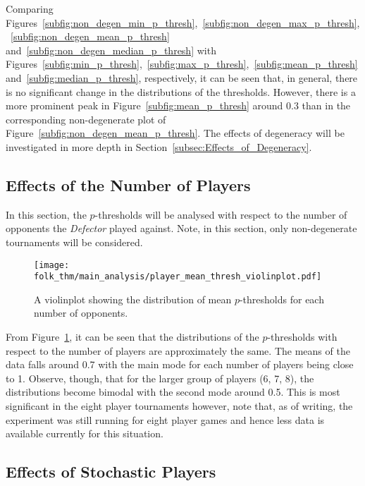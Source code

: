 Comparing Figures~\ref{subfig:non_degen_min_p_thresh},~\ref{subfig:non_degen_max_p_thresh},~\ref{subfig:non_degen_mean_p_thresh}
and~\ref{subfig:non_degen_median_p_thresh} with 
Figures~\ref{subfig:min_p_thresh},~\ref{subfig:max_p_thresh},~\ref{subfig:mean_p_thresh}
and~\ref{subfig:median_p_thresh}, respectively, it can be seen that, in general,
there is no significant change in the distributions of the thresholds. However,
there is a more prominent peak in Figure~\ref{subfig:mean_p_thresh} around 0.3
than in the corresponding non-degenerate plot of
Figure~\ref{subfig:non_degen_mean_p_thresh}. The effects of degeneracy will be
investigated in more depth in Section~\ref{subsec:Effects_of_Degeneracy}. 


\subsection{Effects of the Number of Players}\label{subsec:Effects_of_the_number_of_Players}
In this section, the \(p\)-thresholds will be analysed with respect to the
number of opponents the \textit{Defector} played against. Note, in this section,
only non-degenerate tournaments will be considered.


\begin{figure}
    \centering
    \texttt{[image: folk\_thm/main\_analysis/player\_mean\_thresh\_violinplot.pdf]}
    \caption{A violinplot showing the distribution of mean \(p\)-thresholds for each number of opponents.}\label{fig:player_mean_thresh_violinplot}
\end{figure}

From Figure~\ref{fig:player_mean_thresh_violinplot}, it can be seen that the
distributions of the \(p\)-thresholds with respect to the number of players are
approximately the same. The means of the data falls around 0.7 with the main
mode for each number of players being close to 1. Observe, though, that for the
larger group of players (6, 7, 8), the distributions become bimodal with the
second mode around 0.5. This is most significant in the eight player tournaments
however, note that, as of writing, the experiment was still running for eight
player games and hence less data is available currently for this situation.


\subsection{Effects of Stochastic Players}\label{subsec:Effects_of_Stochastic_Players}


